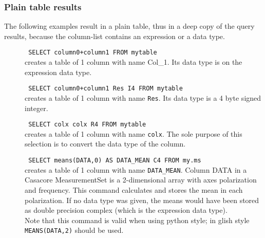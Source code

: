\subsubsection{Plain table results}
The following examples result in a plain table, thus in a deep copy of
the query results, because the column-list contains an expression or
a data type.
\begin{description}
  \item[] \texttt{ SELECT column0+column1 FROM mytable }
    \\creates a table of 1 column with name Col\_1. Its data type
      is on the expression data type.

  \item[] \texttt{ SELECT column0+column1 Res I4 FROM mytable }
    \\creates a table of 1 column with name \texttt{Res}.
      Its data type is a 4 byte signed integer.

  \item[] \texttt{ SELECT colx colx R4 FROM mytable }
    \\creates a table of 1 column with name \texttt{colx}.
      The sole purpose of this selection is to convert the data type
      of the column.

  \item[] \texttt{ SELECT means(DATA,0) AS DATA\_MEAN C4 FROM my.ms }
    \\creates a table of 1 column with name \texttt{DATA\_MEAN}.
      Column DATA in a Casacore MeasurementSet is a 2-dimensional array
      with axes polarization and frequency. This command calculates
      and stores the mean in each polarization.
      If no data type was given, the means would have been stored
      as double precision complex (which is the expression data type).
      \\Note that this command is valid when using python style; in
      glish style \texttt{MEANS(DATA,2)} should be used.

\end{description}

